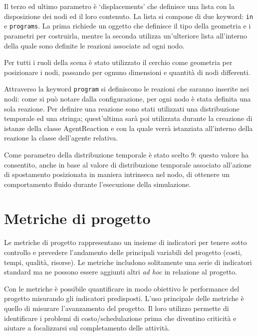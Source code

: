 Il terzo ed ultimo parametro è `displacements' che definisce una lista con la disposizione dei nodi ed il loro contenuto.
%
La lista si compone di due keyword: \texttt{in} e \texttt{programs}. La prima richiede un oggetto che definisce il tipo della geometria e i parametri per costruirla, mentre la seconda utilizza un'ulteriore lista all'interno della quale sono definite le reazioni associate ad ogni nodo.

Per tutti i ruoli della scena è stato utilizzato il cerchio come geometria per posizionare i nodi, passando per ognuno dimensioni e quantità di nodi differenti.

Attraverso la keyword \texttt{program} si definiscono le reazioni che saranno inserite nei nodi: come si può notare dalla configurazione, per ogni nodo è stata definita una sola reazione.
Per definire una reazione sono stati utilizzati una distribuzione temporale ed una stringa; quest'ultima sarà poi utilizzata durante la creazione di istanze della classe AgentReaction e con la quale verrà istanziata all'interno della reazione la classe dell'agente relativa.

Come parametro della distribuzione temporale è stato scelto 9: questo valore ha consentito, anche in base al valore di distribuzione temporale associato all'azione di spostamento posizionata in maniera intrinseca nel nodo, di ottenere un comportamento fluido durante l'esecuzione della simulazione.


\section{Metriche di progetto}
Le metriche di progetto rappresentano un insieme di indicatori per tenere sotto controllo e prevedere l'andamento delle principali variabili del progetto (costi, tempi, qualità, risorse).
Le metriche includono solitamente una serie di indicatori standard ma ne possono essere aggiunti altri \textit{ad hoc} in relazione al progetto.

Con le metriche è possibile quantificare in modo obiettivo le performance del progetto misurando gli indicatori predisposti. L'uso principale delle metriche è quello di misurare l'avanzamento del progetto. Il loro utilizzo permette di identificare i problemi di costo/schedulazione prima che diventino criticità e aiutare a focalizzarsi sul completamento delle attività.

